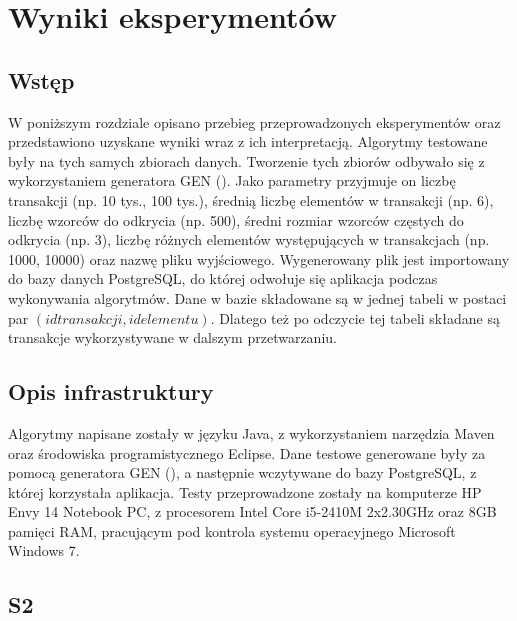 \chapter{Wyniki eksperymentów}
\label{c5}

\section{Wstęp}
\label{5.1}
W poniższym rozdziale opisano przebieg przeprowadzonych eksperymentów oraz przedstawiono uzyskane wyniki wraz z ich interpretacją. Algorytmy testowane były na tych samych zbiorach danych. Tworzenie tych zbiorów odbywało się z wykorzystaniem generatora GEN (\cite{AgrawalGEN}). Jako parametry przyjmuje on liczbę transakcji (np. 10 tys., 100 tys.), średnią liczbę elementów w transakcji (np. 6), liczbę wzorców do odkrycia (np. 500), średni rozmiar wzorców częstych do odkrycia (np. 3), liczbę różnych elementów występujących w transakcjach (np. 1000, 10000) oraz nazwę pliku wyjściowego. Wygenerowany plik jest importowany do bazy danych PostgreSQL, do której odwołuje się aplikacja podczas wykonywania algorytmów. Dane w bazie składowane są w jednej tabeli w postaci par \((id transakcji, id elementu)\). Dlatego też po odczycie tej tabeli składane są transakcje wykorzystywane w dalszym przetwarzaniu. 

\section{Opis infrastruktury}
\label{c13}
Algorytmy napisane zostały w języku Java, z wykorzystaniem narzędzia Maven oraz środowiska programistycznego Eclipse. Dane testowe generowane były za pomocą generatora GEN (\cite{AgrawalGEN}), a następnie wczytywane do bazy PostgreSQL, z której korzystała aplikacja. Testy przeprowadzone zostały na komputerze HP Envy 14 Notebook PC, z procesorem Intel Core i5-2410M 2x2.30GHz oraz 8GB pamięci RAM, pracującym pod kontrola systemu operacyjnego Microsoft Windows 7. 

\section{S2}
